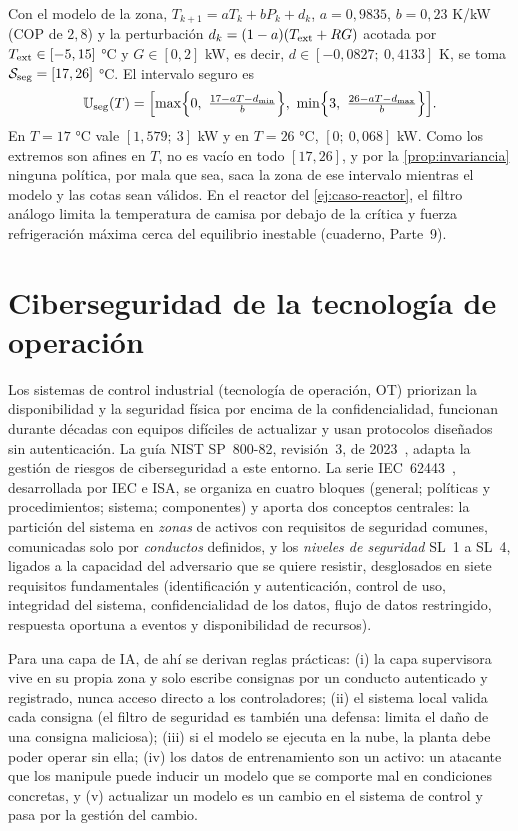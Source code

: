 \begin{ejemplo}\label{ej:filtro}
Con el modelo de la zona, $T_{k+1}=aT_k+bP_k+d_k$, $a=0{,}9835$, $b=0{,}23$ K/kW (COP de $2{,}8$) y la perturbación $d_k=(1-a)(T_{\mathrm{ext}}+RG)$ acotada por $T_{\mathrm{ext}}\in[-5,15]$ °C y $G\in[0,2]$ kW, es decir, $d\in[-0{,}0827;\ 0{,}4133]$ K, se toma $\mathcal{S}_{\mathrm{seg}}=[17,26]$ °C. El intervalo seguro es
\[
\Uset_{\mathrm{seg}}(T)=\Bigl[\max\Bigl\{0,\ \tfrac{17-aT-d_{\min}}{b}\Bigr\},\ \min\Bigl\{3,\ \tfrac{26-aT-d_{\max}}{b}\Bigr\}\Bigr].
\]
En $T=17$ °C vale $[1{,}579;\ 3]$ kW y en $T=26$ °C, $[0;\ 0{,}068]$ kW. Como los extremos son afines en $T$, no es vacío en todo $[17,26]$, y por la \cref{prop:invariancia} ninguna política, por mala que sea, saca la zona de ese intervalo mientras el modelo y las cotas sean válidos. En el reactor del \cref{ej:caso-reactor}, el filtro análogo limita la temperatura de camisa por debajo de la crítica y fuerza refrigeración máxima cerca del equilibrio inestable (cuaderno, Parte~9).
\end{ejemplo}

\section{Ciberseguridad de la tecnología de operación}

Los sistemas de control industrial (tecnología de operación, OT) priorizan la disponibilidad y la seguridad física por encima de la confidencialidad, funcionan durante décadas con equipos difíciles de actualizar y usan protocolos diseñados sin autenticación. La guía NIST SP~800-82, revisión~3, de 2023~\cite{nist}, adapta la gestión de riesgos de ciberseguridad a este entorno. La serie IEC~62443~\cite{iec62443}, desarrollada por IEC e ISA, se organiza en cuatro bloques (general; políticas y procedimientos; sistema; componentes) y aporta dos conceptos centrales: la partición del sistema en \emph{zonas} de activos con requisitos de seguridad comunes, comunicadas solo por \emph{conductos} definidos, y los \emph{niveles de seguridad} SL~1 a SL~4, ligados a la capacidad del adversario que se quiere resistir, desglosados en siete requisitos fundamentales (identificación y autenticación, control de uso, integridad del sistema, confidencialidad de los datos, flujo de datos restringido, respuesta oportuna a eventos y disponibilidad de recursos).

Para una capa de IA, de ahí se derivan reglas prácticas: (i) la capa supervisora vive en su propia zona y solo escribe consignas por un conducto autenticado y registrado, nunca acceso directo a los controladores; (ii) el sistema local valida cada consigna (el filtro de seguridad es también una defensa: limita el daño de una consigna maliciosa); (iii) si el modelo se ejecuta en la nube, la planta debe poder operar sin ella; (iv) los datos de entrenamiento son un activo: un atacante que los manipule puede inducir un modelo que se comporte mal en condiciones concretas, y (v) actualizar un modelo es un cambio en el sistema de control y pasa por la gestión del cambio.

